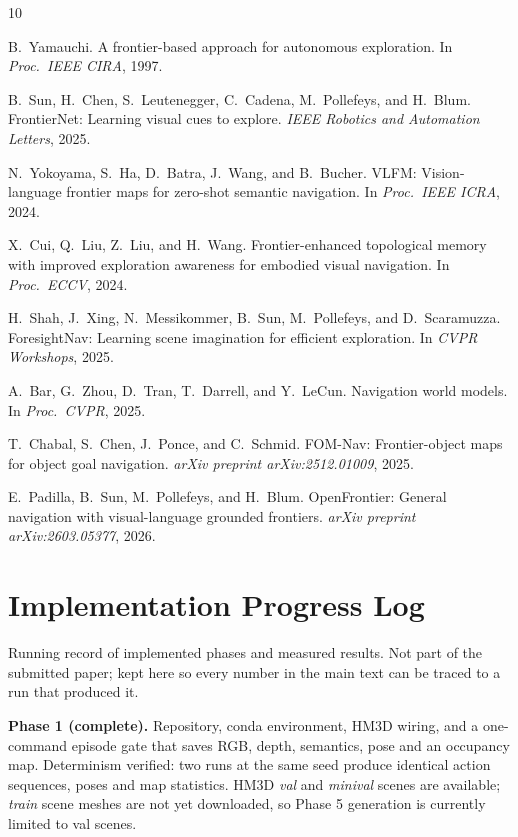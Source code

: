 \documentclass[10pt,twocolumn]{article}
\begin{document}
\begin{thebibliography}{10}
\footnotesize

B.~Yamauchi.
\newblock A frontier-based approach for autonomous exploration.
\newblock In \textit{Proc.\ IEEE CIRA}, 1997.

B.~Sun, H.~Chen, S.~Leutenegger, C.~Cadena, M.~Pollefeys, and H.~Blum.
\newblock FrontierNet: Learning visual cues to explore.
\newblock \textit{IEEE Robotics and Automation Letters}, 2025.

N.~Yokoyama, S.~Ha, D.~Batra, J.~Wang, and B.~Bucher.
\newblock VLFM: Vision-language frontier maps for zero-shot semantic
navigation.
\newblock In \textit{Proc.\ IEEE ICRA}, 2024.

X.~Cui, Q.~Liu, Z.~Liu, and H.~Wang.
\newblock Frontier-enhanced topological memory with improved exploration
awareness for embodied visual navigation.
\newblock In \textit{Proc.\ ECCV}, 2024.

H.~Shah, J.~Xing, N.~Messikommer, B.~Sun, M.~Pollefeys, and D.~Scaramuzza.
\newblock ForesightNav: Learning scene imagination for efficient exploration.
\newblock In \textit{CVPR Workshops}, 2025.

A.~Bar, G.~Zhou, D.~Tran, T.~Darrell, and Y.~LeCun.
\newblock Navigation world models.
\newblock In \textit{Proc.\ CVPR}, 2025.

T.~Chabal, S.~Chen, J.~Ponce, and C.~Schmid.
\newblock FOM-Nav: Frontier-object maps for object goal navigation.
\newblock \textit{arXiv preprint arXiv:2512.01009}, 2025.

E.~Padilla, B.~Sun, M.~Pollefeys, and H.~Blum.
\newblock OpenFrontier: General navigation with visual-language grounded
frontiers.
\newblock \textit{arXiv preprint arXiv:2603.05377}, 2026.

\end{thebibliography}

\clearpage
\appendix

\section{Implementation Progress Log}

Running record of implemented phases and measured results. Not part of the
submitted paper; kept here so every number in the main text can be traced to a
run that produced it.

\textbf{Phase 1 (complete).} Repository, conda environment, HM3D wiring, and a
one-command episode gate that saves RGB, depth, semantics, pose and an
occupancy map. Determinism verified: two runs at the same seed produce
identical action sequences, poses and map statistics. HM3D \emph{val} and
\emph{minival} scenes are available; \emph{train} scene meshes are not yet
downloaded, so Phase 5 generation is currently limited to val scenes.
\end{document}
